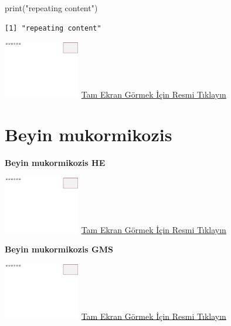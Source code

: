\documentclass[
  letterpaper,
  DIV=11,
  numbers=noendperiod]{scrreprt}
\newenvironment{Shaded}{}{}
\newcommand{\FunctionTok}[1]{\textcolor[rgb]{0.44,0.26,0.76}{#1}}
\newcommand{\NormalTok}[1]{\textcolor[rgb]{0.14,0.16,0.18}{#1}}
\newcommand{\StringTok}[1]{\textcolor[rgb]{0.01,0.18,0.38}{#1}}
\begin{document}
\begin{Shaded}
\begin{Highlighting}[]
\FunctionTok{print}\NormalTok{(}\StringTok{"repeating content"}\NormalTok{)}
\end{Highlighting}
\end{Shaded}

\begin{verbatim}
[1] "repeating content"
\end{verbatim}

\href{https://images.patolojiatlasi.com/template/HE.html}{\includegraphics[width=0.25\textwidth,height=\textheight]{./screenshots/template_screenshot.png}}
\href{https://images.patolojiatlasi.com/candidaalbicans/cervicovaginalsmear/viewer_z0.html}{Tam
Ekran Görmek İçin Resmi Tıklayın}

\hypertarget{sec-beyin-mukormikozis}{%
\section{Beyin mukormikozis}\label{sec-beyin-mukormikozis}}

\textbf{Beyin mukormikozis HE}

\href{https://images.patolojiatlasi.com/template/HE.html}{\includegraphics[width=0.25\textwidth,height=\textheight]{./screenshots/template_screenshot.png}}
\href{https://images.patolojiatlasi.com/brain-mucormycosis/HE.html}{Tam
Ekran Görmek İçin Resmi Tıklayın}

\textbf{Beyin mukormikozis GMS}

\href{https://images.patolojiatlasi.com/template/HE.html}{\includegraphics[width=0.25\textwidth,height=\textheight]{./screenshots/template_screenshot.png}}
\href{https://images.patolojiatlasi.com/brain-mucormycosis/HE.html}{Tam
Ekran Görmek İçin Resmi Tıklayın}
\end{document}
